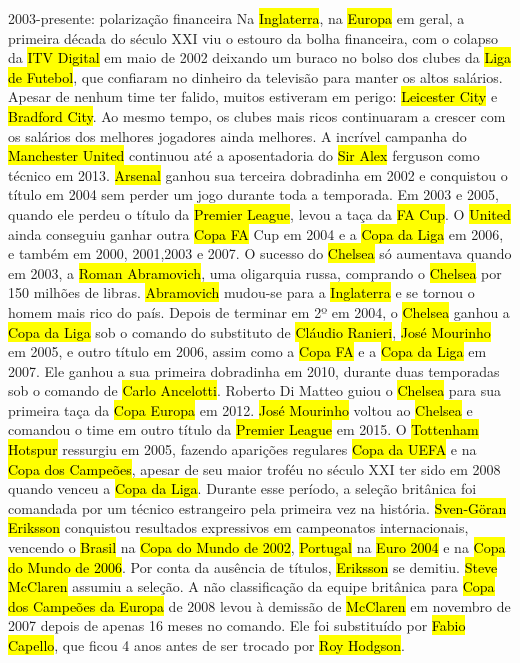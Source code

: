 \documentclass[a4paper,12pt]{article}
\begin{document}
2003-presente: polarização financeira
Na \hl{Inglaterra}, na \hl{Europa} em geral, a primeira década do século XXI viu o estouro da bolha financeira, com o colapso da \hl{ITV Digital} em maio de 2002 deixando um buraco no bolso dos clubes da \hl{Liga de Futebol}, que confiaram no dinheiro da televisão para manter os altos salários. Apesar de nenhum time ter falido, muitos estiveram em perigo: \hl{Leicester City} e \hl{Bradford City}.
Ao mesmo tempo, os clubes mais ricos continuaram a crescer com os salários dos melhores jogadores ainda melhores. A incrível campanha do \hl{Manchester United} continuou até a aposentadoria do \hl{Sir Alex} ferguson como técnico em 2013. \hl{Arsenal} ganhou sua terceira dobradinha em 2002 e conquistou o título em 2004 sem perder um jogo durante toda a temporada. Em 2003 e 2005, quando ele perdeu o título da \hl{Premier League}, levou a taça da \hl{FA Cup}. O \hl{United} ainda conseguiu ganhar outra \hl{Copa FA} Cup em 2004 e a \hl{Copa da Liga} em 2006, e também em 2000, 2001,2003 e 2007.
O sucesso do \hl{Chelsea} só aumentava quando em 2003, a \hl{Roman Abramovich}, uma oligarquia russa, comprando o \hl{Chelsea} por 150 milhões de libras. \hl{Abramovich} mudou-se para a \hl{Inglaterra} e se tornou o homem mais rico do país. Depois de terminar em 2º em 2004, o \hl{Chelsea} ganhou a \hl{Copa da Liga} sob o comando do substituto de \hl{Cláudio Ranieri}, \hl{José Mourinho} em 2005, e outro título em 2006, assim como a \hl{Copa FA} e a \hl{Copa da Liga} em 2007. Ele ganhou a sua primeira dobradinha em 2010, durante duas temporadas sob o comando de \hl{Carlo Ancelotti}. Roberto Di Matteo guiou o \hl{Chelsea} para sua primeira taça da \hl{Copa Europa} em 2012. \hl{José Mourinho} voltou ao \hl{Chelsea} e comandou o time em outro título da \hl{Premier League} em 2015.
O \hl{Tottenham Hotspur} ressurgiu em 2005, fazendo aparições regulares \hl{Copa da UEFA} e na \hl{Copa dos Campeões}, apesar de seu maior troféu no século XXI ter sido em 2008 quando venceu a \hl{Copa da Liga}.
Durante esse período, a seleção britânica foi comandada por um técnico estrangeiro pela primeira vez na história. \hl{Sven-Göran Eriksson} conquistou resultados expressivos em campeonatos internacionais, vencendo o \hl{Brasil} na \hl{Copa do Mundo de 2002}, \hl{Portugal} na \hl{Euro 2004} e na \hl{Copa do Mundo de 2006}. Por conta da ausência de títulos, \hl{Eriksson} se demitiu. \hl{Steve McClaren} assumiu a seleção. A não classificação da equipe britânica para \hl{Copa dos Campeões da Europa} de 2008 levou à demissão de \hl{McClaren} em novembro de 2007 depois de apenas 16 meses no comando. Ele foi substituído por \hl{Fabio Capello}, que ficou 4 anos antes de ser trocado por \hl{Roy Hodgson}.
\end{document}
